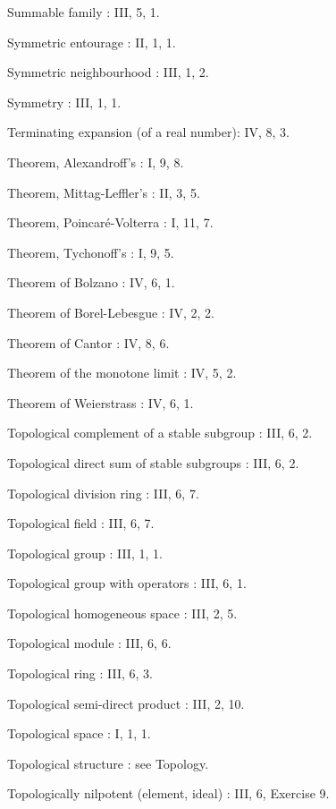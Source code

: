 Summable family : III, 5, 1.

Symmetric entourage : II, 1, 1.

Symmetric neighbourhood : III, 1, 2.

Symmetry : III, 1, 1.

Terminating expansion (of a real number): IV, 8, 3.

Theorem, Alexandroff's : I, 9, 8.

Theorem, Mittag-Leffler's : II, 3, 5.

Theorem, Poincaré-Volterra : I, 11, 7.

Theorem, Tychonoff's : I, 9, 5.

Theorem of Bolzano : IV, 6, 1.

Theorem of Borel-Lebesgue : IV, 2, 2.

Theorem of Cantor : IV, 8, 6.

Theorem of the monotone limit : IV, 5, 2.

Theorem of Weierstrass : IV, 6, 1.

Topological complement of a stable subgroup : III, 6, 2.

Topological direct sum of stable subgroups : III, 6, 2.

Topological division ring : III, 6, 7.

Topological field : III, 6, 7.

Topological group : III, 1, 1.

Topological group with operators : III, 6, 1.

Topological homogeneous space : III, 2, 5.

Topological module : III, 6, 6.

Topological ring : III, 6, 3.

Topological semi-direct product : III, 2, 10.

Topological space : I, 1, 1.

Topological structure : see Topology.

Topologically nilpotent (element, ideal) : III, 6, Exercise 9.

